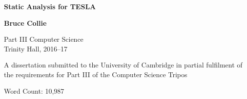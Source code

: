 \begin{titlepage}
  \begin{center}
  
  \vspace*{1cm}
  \Huge\textbf{Static Analysis for TESLA}

  \LARGE
  \vspace{1.5cm}
  \textbf{Bruce Collie}

  \vspace{0.5cm}


  \large
  Part III Computer Science \\
  Trinity Hall, 2016--17

  \vfill

  \vspace{1.5cm}

  \normalsize
  A dissertation submitted to the University of Cambridge in partial fulfilment
    of the requirements for Part III of the Computer Science Tripos

  \vspace{1.5cm}

  \small
  Word Count: 10,987

  \end{center}
\end{titlepage}
